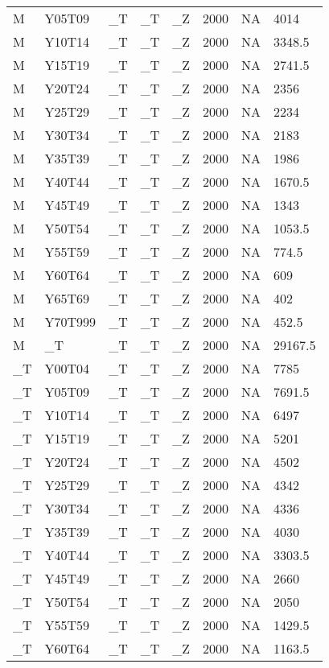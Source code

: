 \begin{longtable}[t]{llllllll}
\addlinespace
M & Y05T09 & \_T & \_T & \_Z & 2000 & NA & 4014\\
M & Y10T14 & \_T & \_T & \_Z & 2000 & NA & 3348.5\\
M & Y15T19 & \_T & \_T & \_Z & 2000 & NA & 2741.5\\
M & Y20T24 & \_T & \_T & \_Z & 2000 & NA & 2356\\
M & Y25T29 & \_T & \_T & \_Z & 2000 & NA & 2234\\
\addlinespace
M & Y30T34 & \_T & \_T & \_Z & 2000 & NA & 2183\\
M & Y35T39 & \_T & \_T & \_Z & 2000 & NA & 1986\\
M & Y40T44 & \_T & \_T & \_Z & 2000 & NA & 1670.5\\
M & Y45T49 & \_T & \_T & \_Z & 2000 & NA & 1343\\
M & Y50T54 & \_T & \_T & \_Z & 2000 & NA & 1053.5\\
\addlinespace
M & Y55T59 & \_T & \_T & \_Z & 2000 & NA & 774.5\\
M & Y60T64 & \_T & \_T & \_Z & 2000 & NA & 609\\
M & Y65T69 & \_T & \_T & \_Z & 2000 & NA & 402\\
M & Y70T999 & \_T & \_T & \_Z & 2000 & NA & 452.5\\
M & \_T & \_T & \_T & \_Z & 2000 & NA & 29167.5\\
\addlinespace
\_T & Y00T04 & \_T & \_T & \_Z & 2000 & NA & 7785\\
\_T & Y05T09 & \_T & \_T & \_Z & 2000 & NA & 7691.5\\
\_T & Y10T14 & \_T & \_T & \_Z & 2000 & NA & 6497\\
\_T & Y15T19 & \_T & \_T & \_Z & 2000 & NA & 5201\\
\_T & Y20T24 & \_T & \_T & \_Z & 2000 & NA & 4502\\
\addlinespace
\_T & Y25T29 & \_T & \_T & \_Z & 2000 & NA & 4342\\
\_T & Y30T34 & \_T & \_T & \_Z & 2000 & NA & 4336\\
\_T & Y35T39 & \_T & \_T & \_Z & 2000 & NA & 4030\\
\_T & Y40T44 & \_T & \_T & \_Z & 2000 & NA & 3303.5\\
\_T & Y45T49 & \_T & \_T & \_Z & 2000 & NA & 2660\\
\addlinespace
\_T & Y50T54 & \_T & \_T & \_Z & 2000 & NA & 2050\\
\_T & Y55T59 & \_T & \_T & \_Z & 2000 & NA & 1429.5\\
\_T & Y60T64 & \_T & \_T & \_Z & 2000 & NA & 1163.5\\

\end{longtable}
